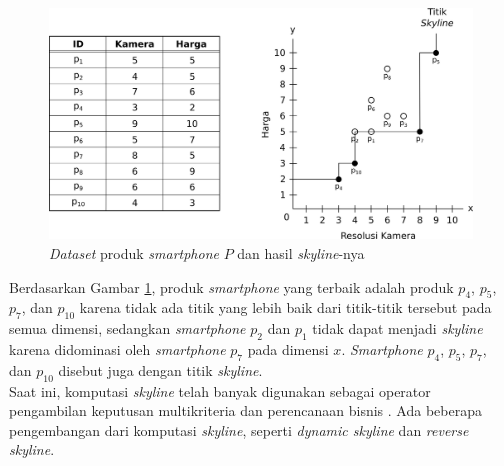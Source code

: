 \begin{figure}[H]
	\centerline {
		\includegraphics[width=\linewidth]{bab2/img/ex1.png}
	}
	\caption{\textit{Dataset} produk \textit{smartphone} $P$ dan hasil \textit{skyline}-nya}
	\label{figure:contoh-skyline}
\end{figure}

Berdasarkan Gambar \ref{figure:contoh-skyline}, produk \textit{smartphone} yang terbaik adalah produk $p_4$, $p_5$, $p_7$, dan $p_{10}$ karena tidak ada titik yang lebih baik dari titik-titik tersebut pada semua dimensi, sedangkan \textit{smartphone} $p_2$ dan $p_1$ tidak dapat menjadi \textit{skyline} karena didominasi oleh \textit{smartphone} $p_7$ pada dimensi $x$. \textit{Smartphone} $p_4$, $p_5$, $p_7$, dan $p_{10}$ disebut juga dengan titik \textit{skyline}.\\
\tab Saat ini, komputasi \textit{skyline} telah banyak digunakan sebagai operator pengambilan keputusan multikriteria dan perencanaan bisnis \cite{dynamic-skyline-2}. Ada beberapa pengembangan dari komputasi \textit{skyline}, seperti \textit{dynamic skyline} dan \textit{reverse skyline}.  


